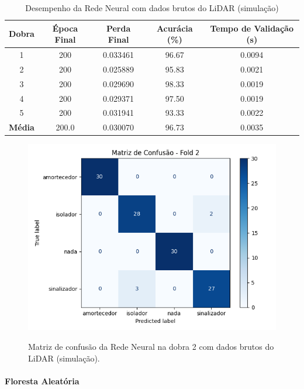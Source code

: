 \begin{table}[H]
\centering
\caption{Desempenho da Rede Neural com dados brutos do LiDAR (simulação)}
\label{tab:rede_neural_lidar_bruto}
\begin{tabular}{ccccc}
\hline
\textbf{Dobra} & \textbf{Época Final} & \textbf{Perda Final} & \textbf{Acurácia (\%)} & \textbf{Tempo de Validação (s)} \\
\hline
1 & 200 & 0.033461 & 96.67 & 0.0094 \\
2 & 200 & 0.025889 & 95.83 & 0.0021 \\
3 & 200 & 0.029690 & 98.33 & 0.0019 \\
4 & 200 & 0.029371 & 97.50 & 0.0019 \\
5 & 200 & 0.031941 & 93.33 & 0.0022 \\
\hline
\textbf{Média} & 200.0 & 0.030070 & 96.73 & 0.0035 \\
\hline
\end{tabular} \fonte{}
\end{table}

\begin{figure}[H]
\caption{Matriz de confusão da Rede Neural na dobra 2 com dados brutos do LiDAR (simulação).}
\includegraphics[width=0.7\linewidth]{figuras/Resultados/simu_principal_Teste2_nn.png}
\fonte{}
\label{fig:matriz_confusao_nn_lidar_bruto}
\end{figure}


\paragraph{Floresta Aleatória}

